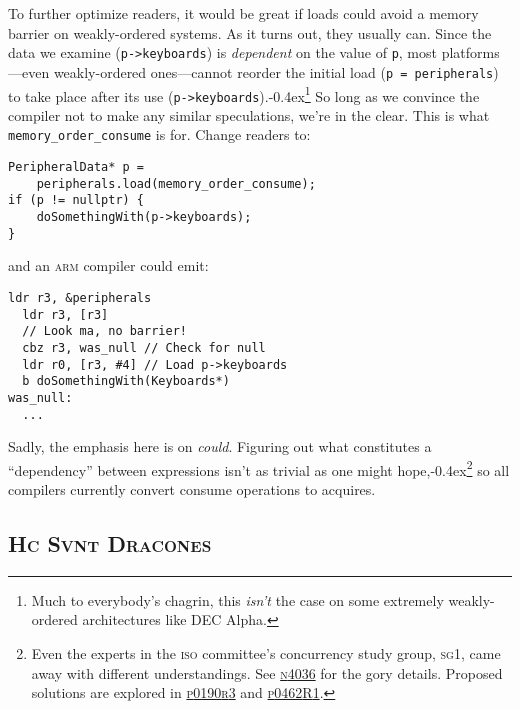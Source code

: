 \documentclass[fontsize=\bodyfontsize, numbers=endperiod]{scrartcl}
\newcommand{\codesize}{\fontsize{\bodyfontsize}{\bodybaselineskip}}
\newcommand{\punckern}{\kern-0.4ex}
\newcommand{\monobox}[1]{\mbox{\texttt{#1}}}
\newenvironment{colfigure}
  {\par\vspace{1\baselineskip minus 0.5\baselineskip}\noindent\minipage{\linewidth}}
  {\endminipage\vspace{1\baselineskip minus 0.7\baselineskip}}
\begin{document}
\begin{multicols}{2}
To further optimize readers,
it would be great if loads could avoid a memory barrier
on weakly-ordered systems.
As it turns out, they usually can.
Since the data we examine (\texttt{p->keyboards})
is \emph{dependent} on the value of \texttt{p},
most platforms---even weakly-ordered ones---cannot reorder the initial
load (\texttt{p = peripherals}) to take place after its use
(\texttt{p->keyboards}).\punckern\footnote{Much to everybody's chagrin,
this \emph{isn't} the case on some extremely weakly-ordered architectures like
DEC Alpha.}
So long as we convince the compiler not to make any similar speculations,
we're in the clear.
This is what \monobox{memory\_order\_consume} is for.
Change readers to:
\begin{colfigure}
\begin{verbatim}
PeripheralData* p =
    peripherals.load(memory_order_consume);
if (p != nullptr) {
    doSomethingWith(p->keyboards);
}
\end{verbatim}
\end{colfigure}
and an \textsc{arm} compiler could emit:
\begin{colfigure}
\begin{lstlisting}[language={[ARM]Assembler}]
  ldr r3, &peripherals
  ldr r3, [r3]
  // Look ma, no barrier!
  cbz r3, was_null // Check for null
  ldr r0, [r3, #4] // Load p->keyboards
  b doSomethingWith(Keyboards*)
was_null:
  ...
\end{lstlisting}
\end{colfigure}

Sadly, the emphasis here is on \emph{could}.
Figuring out what constitutes a ``dependency'' between expressions isn't
as trivial as one might hope,\punckern\footnote{Even the experts in
the \textsc{iso} committee's concurrency study group, \textsc{sg}1,
came away with different understandings.
See
\href{http://www.open-std.org/jtc1/sc22/wg21/docs/papers/2014/n4036.pdf}{\textsc{n}4036}
for the gory details.
Proposed solutions are explored in
\href{http://www.open-std.org/jtc1/sc22/wg21/docs/papers/2017/p0190r3.pdf}{\textsc{p}0190\textsc{r}3}
and
\href{http://www.open-std.org/jtc1/sc22/wg21/docs/papers/2017/p0462r1.pdf}{\textsc{p}0462\textsc{R}1}.
}
so all compilers currently convert consume operations to acquires.

\subsection{\textsc{Hc Svnt Dracones}}


\end{multicols}
\end{document}
